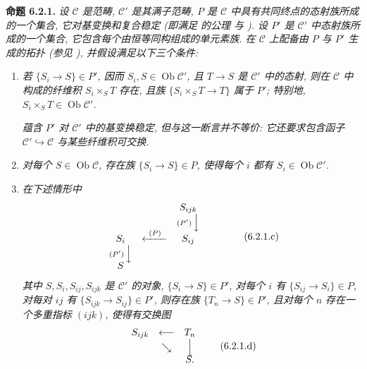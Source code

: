 \medskip
\noindent{}\textbf{命题 6.2.1.}
\textit{设 \(\mathscr C\) 是范畴, \(\mathscr C'\) 是其满子范畴,
\(P\) 是 \(\mathscr C\) 中具有共同终点的态射族所成的一个集合,
它对基变换和复合稳定 (即满足  的公理
 与
).
设 \(P'\) 是 \(\mathscr C'\) 中态射族所成的一个集合,
它包含每个由恒等同构组成的单元素族.
在 \(\mathscr C\) 上配备由 \(P\) 与 \(P'\) 生成的拓扑
(参见 ), 并假设满足以下三个条件:}

\begin{enumerate}
  \item[(a)] \textit{若 \(\{S_i\to S\}\in P'\),
    因而 \(S_i,S\in\operatorname{Ob}\mathscr C'\),
    且 \(T\to S\) 是 \(\mathscr C'\) 中的态射,
    则在 \(\mathscr C\) 中构成的纤维积 \(S_i\times_ST\) 存在,
    且族 \(\{S_i\times_ST\to T\}\) 属于 \(P'\);
    特别地, \(S_i\times_ST\in\operatorname{Ob}\mathscr C'\).}

    \textit{蕴含
    \(P'\) 对 \(\mathscr C'\) 中的基变换稳定, 但与这一断言并不等价:
    它还要求包含函子 \(\mathscr C'\hookrightarrow\mathscr C\)
    与某些纤维积可交换.}

  \item[(b)] \textit{对每个
    \(S\in\operatorname{Ob}\mathscr C\), 存在族 \(\{S_i\to S\}\in P\),
    使得每个 \(i\) 都有 \(S_i\in\operatorname{Ob}\mathscr C'\).}

  \item[(c)] \textit{在下述情形中}
    \[
    \begin{array}{ccccc}
      & & S_{ijk} & &\\
      & & \scriptstyle(P')\,\Big\downarrow & &\\[-0.25em]
      S_i & \xleftarrow{\ (P)\ } & S_{ij} & &\\
      \scriptstyle(P')\,\Big\downarrow & & & &\\[-0.25em]
      S & & & &
    \end{array}
    \tag{6.2.1.c}\label{sga3:iv:proposition:6:2:1:eq:6:2:1:c:01}
    \]
    \textit{其中 \(S,S_i,S_{ij},S_{ijk}\) 是 \(\mathscr C'\) 的对象,
    \(\{S_i\to S\}\in P'\), 对每个 \(i\) 有 \(\{S_{ij}\to S_i\}\in P\),
    对每对 \(ij\) 有 \(\{S_{ijk}\to S_{ij}\}\in P'\),
    则存在族 \(\{T_n\to S\}\in P'\), 且对每个 \(n\)
    存在一个多重指标 \((ijk)\), 使得有交换图}
    \[
    \begin{array}{ccccc}
      S_{ijk} & \longleftarrow & T_n\\
      & \searrow & \Big\downarrow\\[-0.25em]
      & & S .
    \end{array}
    \tag{6.2.1.d}\label{sga3:iv:proposition:6:2:1:eq:6:2:1:d:01}
    \]
\end{enumerate}

